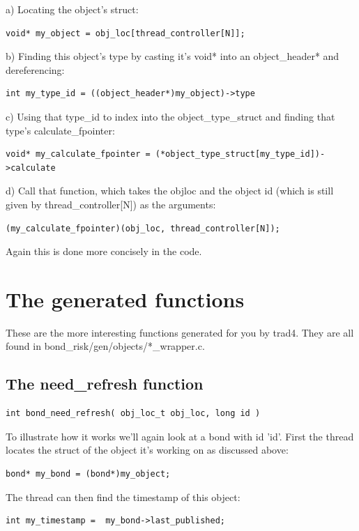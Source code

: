 \documentclass{report}
\begin{document}
a) Locating the object's struct:
\begin{verbatim}
void* my_object = obj_loc[thread_controller[N]];
\end{verbatim}

b) Finding this object's type by casting it's void* into an object_header* and dereferencing:
\begin{verbatim}
int my_type_id = ((object_header*)my_object)->type  
\end{verbatim}

c) Using that type_id to index into the object_type_struct and finding that type's calculate_fpointer:
\begin{verbatim}
void* my_calculate_fpointer = (*object_type_struct[my_type_id])->calculate
\end{verbatim}

d) Call that function, which takes the objloc and the object id (which is still given by thread_controller[N]) as the arguments:
\begin{verbatim}
(my_calculate_fpointer)(obj_loc, thread_controller[N]);
\end{verbatim}

Again this is done more concisely in the code.

\section{The generated functions}

These are the more interesting functions generated for you by trad4. They are all found in bond_risk/gen/objects/*_wrapper.c.

\subsection{The need_refresh function}

\begin{verbatim}
int bond_need_refresh( obj_loc_t obj_loc, long id )
\end{verbatim}

To illustrate how it works we'll again look at a bond with id 'id'.  First the thread locates the struct of the object it's working on as discussed above:

\begin{verbatim}
bond* my_bond = (bond*)my_object;
\end{verbatim}

The thread can then find the timestamp of this object:
\begin{verbatim}
int my_timestamp =  my_bond->last_published;
\end{verbatim}
\end{document}
